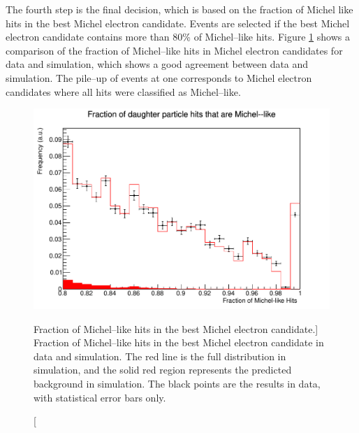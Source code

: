 The fourth step is the final decision, which is based on the fraction of Michel
like hits in the best Michel electron candidate. Events are selected if the 
best Michel electron candidate contains more than 80\% of Michel--like 
hits. Figure \ref{fig:michel_like_frac} shows a comparison of the fraction of 
Michel--like hits in Michel electron candidates for \protodune{} data and 
simulation, which shows a good agreement between data and simulation. The 
pile--up of events at one corresponds to Michel electron candidates where all 
hits were classified as Michel--like.
\begin{figure}
	\centering
	\includegraphics[width=\textwidth]{figures/michel_like_frac.pdf}
	\caption
	[Fraction of Michel--like hits in the best Michel electron candidate.]
	{Fraction of Michel--like hits in the best Michel electron candidate in data
	and simulation. The red line is the full distribution in simulation, and the 
	solid red region represents the predicted background in simulation. The black
	points are the results in data, with statistical error bars only.}
	\label{fig:michel_like_frac}
\end{figure}

